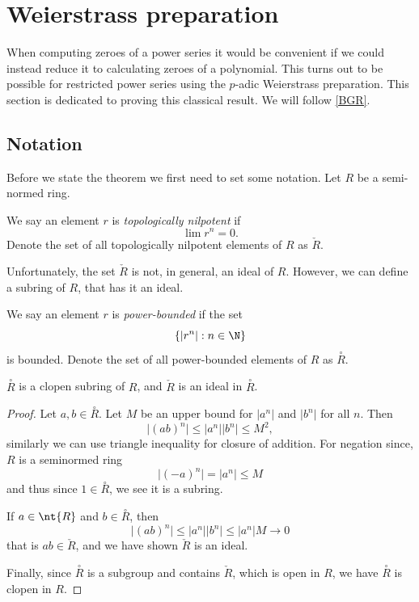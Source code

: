 \chapter{Weierstrass preparation}

When computing zeroes of a power series it would be convenient if we could instead reduce it to
calculating zeroes of a polynomial. This turns out to be possible for restricted power series using
the $p$-adic Weierstrass preparation. This section is dedicated to proving this classical result. We
will follow \ref{BGR}.

\newcommand{\pb}[1]{\overset{\circ}{#1}}
\newcommand{\tn}[1]{\check{#1}}
\newcommand{\res}[1]{\widetilde{#1}}
\newcommand{\quot}[2]{{\raisebox{.2em}{$#1$}\left/\raisebox{-.2em}{$#2$}\right.}}

\section{Notation}

Before we state the theorem we first need to set some notation. Let $R$ be a semi-normed ring.

\begin{definition}
  We say an element $r$ is \emph{topologically nilpotent} if
    \[
     \lim r^n = 0.
    \]
    Denote the set of all topologically nilpotent elements of $R$ as $\tn{R}$.
\end{definition}

Unfortunately, the set $\tn{R}$ is not, in general, an ideal of $R$. However, we can define a
subring of $R$, that has it an ideal.

\begin{definition}
  We say an element $r$ is \emph{power-bounded} if the set
  \[
  \left\{ \lvert r^n \rvert : n \in \N \right\}
  \]
  is bounded.
  Denote the set of all power-bounded elements of $R$ as $\pb{R}$.
\end{definition}

\begin{lemma}
  $\pb{R}$ is a clopen subring of $R$, and $\tn{R}$ is an ideal in $\pb{R}$.
\end{lemma}

\begin{proof}
  Let $a, b \in \pb{R}$. Let $M$ be an upper bound for $\lvert a^n \rvert$ and $\lvert b^n \rvert$
  for all $n$. Then
  \[
  \lvert (a b )^n \rvert \leq \lvert a^n \rvert \lvert b^n \rvert \leq M^2,
  \]
  similarly we can use triangle inequality for closure of addition.
  For negation since, $R$ is a seminormed ring
  \[
  \lvert (- a)^n \rvert = \lvert a^n \rvert \leq M
  \]
  and thus since $1 \in \pb{R}$, we see it is a subring.

  If $a \in \nt{R}$ and $b \in \pb{R}$, then
  \[
  \lvert (a b)^n \rvert \leq \lvert a^n \rvert \lvert b^n \rvert \leq \lvert a^n \rvert M \to 0
  \]
  that is $ a b \in \tn{R}$, and we have shown $\tn{R}$ is an ideal.

  Finally, since $\pb{R}$ is a subgroup and contains $\tn{R}$, which is open in $R$, we have $\pb{R}$
  is clopen in $R$.
\end{proof}

